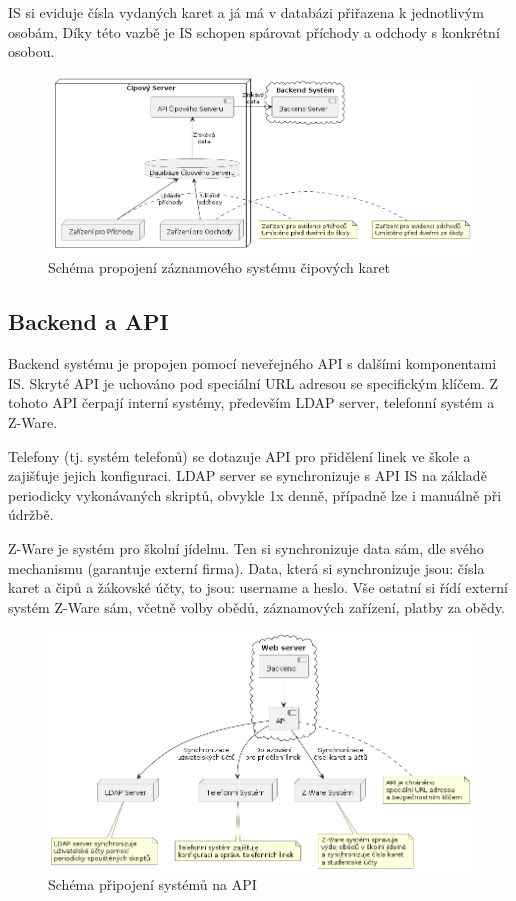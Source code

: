 \documentclass[FM,Proj]{tulthesis}
\begin{document}
IS si eviduje čísla vydaných karet a já má v databázi přiřazena k jednotlivým osobám,
Díky této vazbě je IS schopen spárovat příchody a odchody s konkrétní osobou.

\begin{figure}[H]
    \includegraphics[width=\textwidth-28pt]{backend-cipovy-server.png}
    \caption{Schéma propojení záznamového systému čipových karet}
    \label{fig:backend-cipovy-server}
\end{figure}

\subsection{Backend a API}
\label{section:backend-a-api}
Backend systému je propojen pomocí neveřejného API s dalšími komponentami IS. Skryté API je 
uchováno pod speciální URL adresou se specifickým klíčem. Z tohoto API čerpají interní systémy,
především LDAP server, telefonní systém a Z-Ware.

Telefony (tj. systém telefonů) se dotazuje API pro přidělení linek ve škole a zajišťuje 
jejich konfiguraci. LDAP server se synchronizuje s API IS na základě periodicky vykonávaných
skriptů, obvykle 1x denně, případně lze i manuálně při údržbě.

Z-Ware je systém pro školní jídelnu. Ten si synchronizuje data sám, dle svého mechanismu
(garantuje externí firma). Data, která si synchronizuje jsou: čísla karet a čipů a žákovské 
účty, to jsou: username a heslo. Vše ostatní si řídí externí systém Z-Ware sám, včetně volby
obědů, záznamových zařízení, platby za obědy.

\begin{figure}[H]
    \includegraphics[width=\textwidth-28pt]{backend-api.png}
    \caption{Schéma připojení systémů na API}
    \label{fig:backend-api}
\end{figure}
\end{document}
